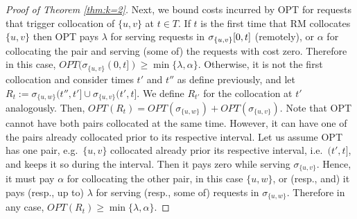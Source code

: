 \documentclass[manuscript,screen=true, review, anonymous]{acmart}
\newcommand{\OPT}{\textsf{OPT}\xspace}
\newcommand{\OPTM}{\mathit{OPT}}
\newcommand{\RM}{\textsf{RM}\xspace} %
\DeclarePairedDelimiter\set{\{}{\}}
\newcommand\mahmoud[1]{}
\begin{document}
\begin{proof}[Proof of Theorem \ref{thm:k=2}]
	Next,
	we bound  costs incurred by \OPT for requests that trigger collocation of $\{u,v\}$ at $t \in T$.
	If $t$ is the first time that \RM collocates $\{u,v\}$ then  \OPT pays
	$\lambda$ for serving requests in $\sigma_{\set{u,v}}[0,t]$ (remotely),
	or $\alpha$ for collocating the pair and
	serving (some of) the requests with  cost zero.
	Therefore in this case,
	$\OPTM (\sigma_{\{u,v\}}(0,t]) \geq  \min{\{ \lambda,\alpha \}}$.
	Otherwise,
	it is not the first collocation and
	consider times $t'$ and $t''$ as define previously,
	 and let 
	$R_t := \sigma_{\{u,w\}}(t'',t'] \cup \sigma_{\{u,v\}}(t',t] $.
	We define $R_{t'}$ for the collocation at $t'$  analogously.
	Then,
	$\OPTM(R_t) = \mathit{OPT} (\sigma_{\{u,w\}}) 
	+ \OPTM(\sigma_{\{u,v\}}) $.
	Note that \OPT cannot have both pairs collocated at the same time.
	However, it can have one of the pairs already collocated prior to its respective interval.
	Let us assume  \OPT has one pair,
	e.g.~$\{u,v\}$ collocated already prior its respective interval, i.e.~$(t',t]$,
	 and keeps it so during the interval.
	 Then it pays zero while serving $\sigma_{\{u,v\}}$.
	Hence,
	it must pay $\alpha$ for collocating the other pair, in this case $\{u,w\}$,
	or (resp., and) it pays (resp., up to) $\lambda$ for serving (resp., some of) requests in $\sigma_{\{u,w\}}$. 
	Therefore in any case,
	$\OPTM(R_t) \geq  \min{\{ \lambda,\alpha \}}$.

	

\end{proof}
\end{document}
